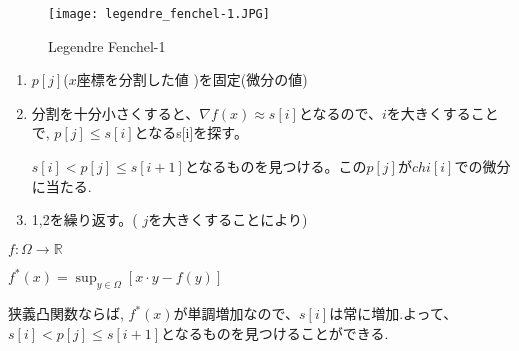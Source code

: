 \documentclass{jsarticle}
\theoremstyle{definition}
\begin{document}
\begin{figure}[htbp]
  \begin{center}
    \texttt{[image: legendre\_fenchel-1.JPG]}
    \caption{Legendre Fenchel-1}
  \end{center}
\end{figure}

\begin{enumerate}
   \item $p[j]$($x$座標を分割した値 )を固定(微分の値)
   \item 分割を十分小さくすると、$\nabla f(x) \approx s[i]$となるので、$i$を大きくすることで, $p[j] \leq s[i]$となるs[i]を探す。
   
             $s[i] < p[j] \leq s[i+1]$となるものを見つける。この$p[j]$が$chi[i]$での微分に当たる.
  \item 1,2を繰り返す。( $j$を大きくすることにより) 
\end{enumerate}

\begin{math}
f:\Omega \to \mathbb{R}
\end{math}

\begin{math}
f^{*}(x) = \displaystyle \sup_{y\in \Omega}{[x \cdot y - f(y)]}
\end{math}

 \color{red}狭義凸関数ならば, $f^*(x)$が単調増加なので、$s[i]$は常に増加.よって、  $s[i] < p[j] \leq s[i+1]$となるものを見つけることができる.\color{black}
\end{document}
